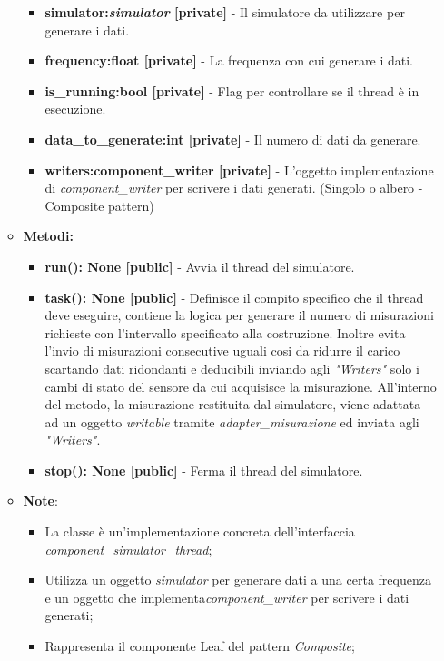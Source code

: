 \begin{itemize}
\begin{itemize}
        \begin{itemize}
            \item \textbf{simulator:\textit{simulator} [private]} - Il simulatore da utilizzare per generare i dati.
            \item \textbf{frequency:float [private]} - La frequenza con cui generare i dati.
            \item \textbf{is\_running:bool [private]} - Flag per controllare se il thread è in esecuzione.
            \item \textbf{data\_to\_generate:int [private]} - Il numero di dati da generare.
            \item \textbf{writers:component\_writer [private]} - L'oggetto implementazione di \textit{component\_writer} per scrivere i dati generati. (Singolo o albero - Composite pattern)
        \end{itemize}
        \item \textbf{Metodi: }
        \begin{itemize}
            \item \textbf{run(): None [public]} - Avvia il thread del simulatore.
            \item \textbf{task(): None [public]} - Definisce il compito specifico che il thread deve eseguire, contiene la logica per generare il numero di misurazioni richieste con l'intervallo specificato alla costruzione.
            Inoltre evita l'invio di misurazioni consecutive uguali cosi da ridurre il carico scartando dati ridondanti e deducibili inviando agli \textit{"Writers"} solo i cambi di stato del sensore da cui acquisisce la misurazione.
            All'interno del metodo, la misurazione restituita dal simulatore, viene adattata ad un oggetto \textit{writable} tramite \textit{adapter\_misurazione} ed inviata agli \textit{"Writers"}.
            \item \textbf{stop(): None [public]} - Ferma il thread del simulatore.
        \end{itemize}
        \item\textbf{Note}:
        \begin{itemize}
            \item La classe è un'implementazione concreta dell'interfaccia \textit{component\_simulator\_thread};
            \item Utilizza un oggetto \textit{\textit{simulator}} per generare dati a una certa frequenza e un oggetto che implementa\textit{component\_writer} per scrivere i dati generati;
            \item Rappresenta il componente Leaf del pattern \textit{Composite};

\end{itemize}
\end{itemize}
\end{itemize}
